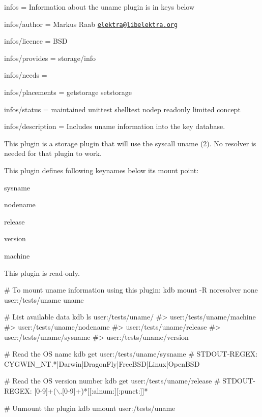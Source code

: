 
\begin{DoxyItemize}
\item infos = Information about the uname plugin is in keys below
\item infos/author = Markus Raab \href{mailto:elektra@libelektra.org}{\tt elektra@libelektra.\+org}
\item infos/licence = B\+SD
\item infos/provides = storage/info
\item infos/needs =
\item infos/placements = getstorage setstorage
\item infos/status = maintained unittest shelltest nodep readonly limited concept
\item infos/description = Includes uname information into the key database.
\end{DoxyItemize}

This plugin is a storage plugin that will use the syscall {\ttfamily uname (2)}. No resolver is needed for that plugin to work.

This plugin defines following keynames below its mount point\+:


\begin{DoxyItemize}
\item sysname
\item nodename
\item release
\item version
\item machine
\end{DoxyItemize}

This plugin is read-\/only.


\begin{DoxyCode}
# To mount uname information using this plugin:
kdb mount -R noresolver none user:/tests/uname uname

# List available data
kdb ls user:/tests/uname/
#> user:/tests/uname/machine
#> user:/tests/uname/nodename
#> user:/tests/uname/release
#> user:/tests/uname/sysname
#> user:/tests/uname/version

# Read the OS name
kdb get user:/tests/uname/sysname
# STDOUT-REGEX: CYGWIN\_NT.*|Darwin|DragonFly|FreeBSD|Linux|OpenBSD

# Read the OS version number
kdb get user:/tests/uname/release
# STDOUT-REGEX: [0-9]+(\(\backslash\).[0-9]+)*[[:alnum:][:punct:]]*

# Unmount the plugin
kdb umount user:/tests/uname
\end{DoxyCode}
 